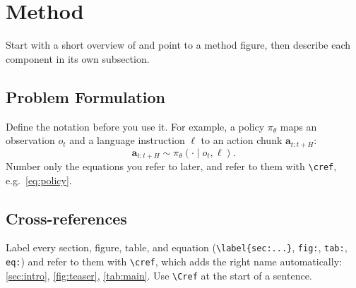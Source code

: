 \section{Method}
\label{sec:method}

Start with a short overview of \method and point to a method figure, then describe each component in its own subsection.

\subsection{Problem Formulation}
\label{sec:problem}

Define the notation before you use it. For example, a policy $\pi_\theta$ maps an observation $o_t$ and a language instruction $\ell$ to an action chunk $\mathbf{a}_{t:t+H}$:
\begin{equation}
    \mathbf{a}_{t:t+H} \sim \pi_\theta(\cdot \mid o_t, \ell).
    \label{eq:policy}
\end{equation}
Number only the equations you refer to later, and refer to them with \verb|\cref|, e.g.\ \cref{eq:policy}.

\subsection{Cross-references}

Label every section, figure, table, and equation (\verb|\label{sec:...}|, \verb|fig:|, \verb|tab:|, \verb|eq:|) and refer to them with \verb|\cref|, which adds the right name automatically: \cref{sec:intro}, \cref{fig:teaser}, \cref{tab:main}. Use \verb|\Cref| at the start of a sentence.
